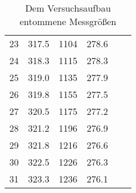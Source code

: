 \begin{table}
\begin{tabular}{c c c c c c}
    23	& 317.5	& 1104	& 278.6	&	&	\\
    24	& 318.3	& 1115	& 278.3	&	&	\\
    25	& 319.0	& 1135	& 277.9	&	&	\\
    26	& 319.8	& 1155	& 277.5	&	&	\\
    27	& 320.5	& 1175	& 277.2	&	&	\\
    28	& 321.2	& 1196	& 276.9	&	&	\\
    29	& 321.8	& 1216	& 276.6	&	&	\\
    30	& 322.5	& 1226	& 276.3	&	&	\\
    31	& 323.3	& 1236	& 276.1	&	&	\\
  \end{tabular}
  \caption{Dem Versuchsaufbau entommene Messgrößen}
  \label{tab:Daten}
\end{table}
